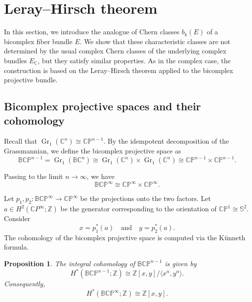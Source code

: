 \documentclass[11pt]{amsart}
\newcommand{\BC}{\mathbb{BC}}       %
\newcommand{\C}{\mathbb{C}}          %
\newcommand{\Z}{\mathbb{Z}}
\newcommand{\wb}{b}
\newcommand{\Gr}{\operatorname{Gr}}
\newcommand{\BCP}{\mathbb{BCP}}
\newcommand{\CP}{\mathbb{CP}}
\newtheorem{prop}{Proposition}[section]   %
\theoremstyle{definition}
\begin{document}
\section{Leray--Hirsch theorem}\label{sec:Leray-hirsch}
In this section, we introduce the analogue of Chern classes $\wb_k(E)$ of a bicomplex fiber bundle $E$. We show that these characteristic classes are not determined by the usual complex Chern classes of the underlying complex bundles $E_\C$, but they satisfy similar properties. As in the complex case, the construction is based on the Leray--Hirsch theorem applied to the bicomplex projective bundle.

\subsection{Bicomplex projective spaces and their cohomology}

Recall that $\Gr_1(\C^n) \cong \CP^{n-1}$. By the idempotent decomposition of the Grassmannian, we define the bicomplex projective space as
\begin{equation*}
    \BCP^{n-1} = \Gr_1(\BC^n) \cong \Gr_1(\C^n)\times \Gr_1(\C^n)\cong\CP^{n-1} \times \CP^{n-1}.
\end{equation*}

Passing to the limit $n \to \infty$, we have
\begin{equation*}
    \BCP^\infty \cong \CP^\infty \times \CP^\infty.
\end{equation*}

Let $p_1, p_2: \BCP^\infty \to \CP^\infty$ be the projections onto the two factors. Let $a \in H^2(\C P^\infty;\Z)$ be the generator corresponding to the orientation of $\CP^1 \cong \mathbb{S}^2$. Consider
\begin{equation*}
    x = p_1^*(a) \quad \text{and}\quad y = p_2^*(a).
\end{equation*}
The cohomology of the bicomplex projective space is computed via the Künneth formula.

\begin{prop}\label{prop:cohomology_bcp}
    The integral cohomology of $\BCP^{n-1}$ is given by
    \begin{equation*}
        H^*(\BCP^{n-1};\Z) \cong \Z[x,y] / \langle x^{n}, y^{n} \rangle.
    \end{equation*}
    Consequently,
    \begin{equation*}
        H^*(\BCP^\infty;\Z) \cong \Z[x,y].
    \end{equation*}
\end{prop}
\end{document}
